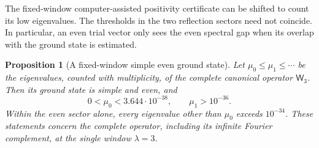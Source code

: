 \documentclass[11pt]{article}
\newtheorem{proposition}[theorem]{Proposition}
\theoremstyle{remark}
\begin{document}
The fixed-window computer-assisted positivity certificate can be shifted to count its low
eigenvalues.  The thresholds in the two reflection sectors need not
coincide.  In particular, an even trial vector only sees the even spectral
gap when its overlap with the ground state is estimated.

\begin{proposition}[A fixed-window simple even ground state]
\label{prop:v117-ground-order}
Let $\mu_0\le\mu_1\le\cdots$ be the eigenvalues, counted with
multiplicity, of the complete canonical operator $\mathsf W_3$.
Then its ground state is simple and even, and
\begin{equation}\label{eq:v117-ground-order}
 0<\mu_0<3.644\cdot10^{-38},\qquad \mu_1>10^{-36}.
\end{equation}
Within the even sector alone, every eigenvalue other than $\mu_0$
exceeds $10^{-34}$.  These statements concern the complete operator,
including its infinite Fourier complement, at the single window
$\lambda=3$.
\end{proposition}
\end{document}
